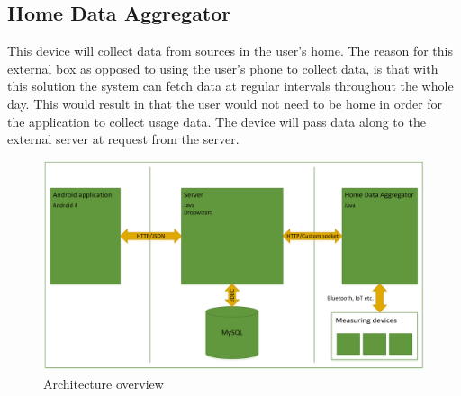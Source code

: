 \subsection{Home Data Aggregator}
This device will collect data from sources in the user's home. The reason for this external box as opposed to using 
the user's phone to collect data, is that with this solution the system can fetch data at regular intervals throughout 
the whole day. This would result in that the user would not need to be home in order for the application to collect 
usage data. The device will pass data along to the external server at request from the server.

\begin{figure}[H]
\includegraphics[width=\textwidth]{ch/implementation/fig/architecture.png}
\caption{Architecture overview}
\end{figure}